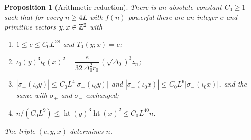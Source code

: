 \documentclass[11pt,reqno]{amsart}
\newtheorem{proposition}[theorem]{Proposition}
\theoremstyle{definition}
\theoremstyle{remark}
\numberwithin{equation}{section}
\newcommand{\hgt}{\operatorname{ht}}
\begin{document}
\begin{proposition}[Arithmetic reduction]\label{prop:A3lift}
There is an absolute constant $C_0\ge1$ such that for every $n\ge4L$ with
$f(n)$ powerful there are an integer $e$ and primitive vectors
$y,x\in\mathbb Z^2$ with
\begin{enumerate}[label=\textup{(\roman*)}]
\item $1\le e\le C_0L^{28}$ and $T_0(y;x)=e$;
\item $\iota_0(y)^3\iota_0(x)^2
=\dfrac{e}{32\,\Delta_0^2r_0}\,(\sqrt{\Delta_0})^3z_n$;
\item $|\sigma_+(\iota_0y)|\le C_0L^4|\sigma_-(\iota_0y)|$
and $|\sigma_+(\iota_0x)|\le C_0L^6|\sigma_-(\iota_0x)|$, and the same
with $\sigma_+$ and $\sigma_-$ exchanged;
\item $n/(C_0L^9)\le\hgt(y)^3\hgt(x)^2\le C_0L^{40}n$.
\end{enumerate}
The triple $(e,y,x)$ determines $n$.
\end{proposition}
\end{document}
